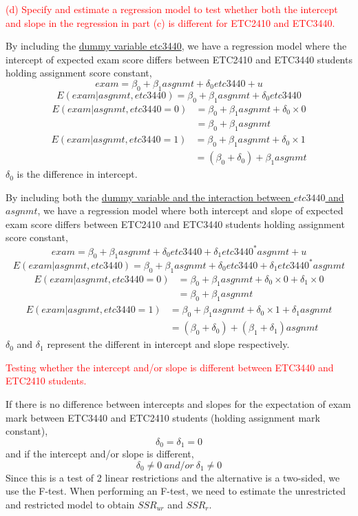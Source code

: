 \documentclass[12pt]{report}
\begin{document}
\newpage
\noindent \textcolor{red}{(d) Specify and estimate a regression model to test whether both the intercept and slope in the regression in part (c) is different for ETC2410 and ETC3440.}

\noindent By including the \uline{dummy variable etc3440}, we have a regression model where the intercept of expected exam score differs between ETC2410 and ETC3440 students holding assignment score constant, $$exam = \beta_0 + \beta_1asgnmt + \delta_0etc3440 + u$$ $$E(exam|asgnmt,etc3440) = \beta_0 + \beta_1asgnmt + \delta_0etc3440$$
\begin{align*}
	E(exam|asgnmt,etc3440=0) &= \beta_0 + \beta_1asgnmt + \delta_0 \times 0 \\
	& = \beta_0 + \beta_1asgnmt
\end{align*}
\begin{align*}
	E(exam|asgnmt,etc3440=1) &= \beta_0 + \beta_1asgnmt + \delta_0 \times 1 \\
	& = (\beta_0 + \delta_0) + \beta_1asgnmt
\end{align*}
\noindent $\delta_0$ is the difference in intercept.

\noindent By including both the \uline{dummy variable and the interaction between $etc3440$ and $asgnmt$}, we have a regression model where both intercept and slope of expected exam score differs between ETC2410 and ETC3440 students holding assignment score constant,
$$exam = \beta_0 + \beta_1asgnmt + \delta_0etc3440 + \delta_1etc3440^*asgnmt + u$$
$$E(exam|asgnmt,etc3440) = \beta_0 + \beta_1asgnmt + \delta_0etc3440 + \delta_1etc3440^*asgnmt $$ \begin{align*}
E(exam|asgnmt,etc3440=0) &= \beta_0 + \beta_1asgnmt + \delta_0 \times 0 + \delta_1\times 0 \\
& = \beta_0 + \beta_1asgnmt
\end{align*}
\begin{align*}
E(exam|asgnmt,etc3440=1) &= \beta_0 + \beta_1asgnmt + \delta_0 \times 1 + \delta_1asgnmt \\
& = (\beta_0 + \delta_0) + (\beta_1 + \delta_1)asgnmt
\end{align*}
\noindent $\delta_0$ and $\delta_1$ represent the different in intercept and slope respectively.

\newpage
\noindent \textcolor{red}
{
	Testing whether the intercept and/or slope is different between ETC3440 and ETC2410 students.
}

\noindent If there is no difference between intercepts and slopes for the expectation of exam mark between ETC3440 and ETC2410 students (holding assignment mark constant),
$$\delta_0 = \delta_1 = 0$$
\noindent and if the intercept and/or slope is different,
$$\delta_0 \neq 0\ and/or\ \delta_1 \neq 0$$
\noindent Since this is a test of 2 linear restrictions and the alternative is a two-sided, we use the F-test. When performing an F-test, we need to estimate the unrestricted and restricted model to obtain $SSR_{ur}$ and $SSR_r$.
\end{document}
